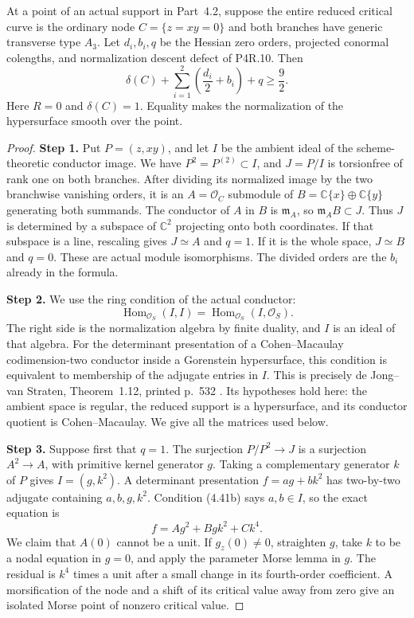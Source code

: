 \begin{proposition}[P4.41]
At a point of an actual support in Part~4.2, suppose the
entire reduced critical curve is the ordinary node
$C=\{z=xy=0\}$ and both branches have generic transverse
type $A_3$. Let $d_i,b_i,q$ be the Hessian zero orders,
projected conormal colengths, and normalization descent
defect of P4R.10. Then
\[
 \delta(C)+\sum_{i=1}^2\left(\frac{d_i}{2}+b_i\right)+q
                         \ge\frac92.                 \tag{4.41a}
\]
Here $R=0$ and $\delta(C)=1$. Equality makes the normalization
of the hypersurface smooth over the point.
\end{proposition}
\begin{proof}
\noindent\textbf{Step 1.} Put $P=(z,xy)$, and let $I$ be the ambient ideal of the
scheme-theoretic conductor image. We have $P^2=P^{(2)}\subset I$,
and $J=P/I$ is torsionfree of rank one on both branches.
After dividing its normalized image by the two branchwise
vanishing orders, it is an $A=\mathcal O_C$ submodule of
$B=\mathbb C\{x\}\oplus\mathbb C\{y\}$ generating both
summands. The conductor of $A$ in $B$ is $\mathfrak m_A$,
so $\mathfrak m_AB\subset J$. Thus $J$ is determined by
a subspace of $\mathbb C^2$ projecting onto both coordinates.
If that subspace is a line, rescaling gives $J\simeq A$ and
$q=1$. If it is the whole space, $J\simeq B$ and $q=0$.
These are actual module isomorphisms. The divided orders are
the $b_i$ already in the formula.

\noindent\textbf{Step 2.} We use the ring condition of the actual conductor:
\[
 \operatorname{Hom}_{\mathcal O_S}(I,I)=
 \operatorname{Hom}_{\mathcal O_S}(I,\mathcal O_S).
                                                               \tag{4.41b}
\]
The right side is the normalization algebra by finite duality,
and $I$ is an ideal of that algebra. For the determinant
presentation of a Cohen--Macaulay codimension-two conductor
inside a Gorenstein hypersurface, this condition is equivalent
to membership of the adjugate entries in $I$. This is precisely
de Jong--van Straten, Theorem~1.12, printed p.~532
\cite{DeJongVanStraten1990Normalization}. Its hypotheses hold
here: the ambient space is regular, the reduced support is a
hypersurface, and its conductor quotient is Cohen--Macaulay.
We give all the matrices used below.

\noindent\textbf{Step 3.} Suppose first that $q=1$. The surjection
$P/P^2\to J$ is a surjection $A^2\to A$, with primitive
kernel generator $g$. Taking a complementary generator $k$
of $P$ gives $I=(g,k^2)$. A determinant presentation
$f=ag+bk^2$ has two-by-two adjugate containing $a,b,g,k^2$.
Condition (4.41b) says $a,b\in I$, so the exact equation is
\[
                   f=Ag^2+Bgk^2+Ck^4.                \tag{4.41c}
\]
We claim that $A(0)$ cannot be a unit. If $g_z(0)\ne0$,
straighten $g$, take $k$ to be a nodal equation in $g=0$,
and apply the parameter Morse lemma in $g$. The residual
is $k^4$ times a unit after a small change in its fourth-order
coefficient. A morsification of the node and a shift of its
critical value away from zero give an isolated Morse point
of nonzero critical value.


\end{proof}
